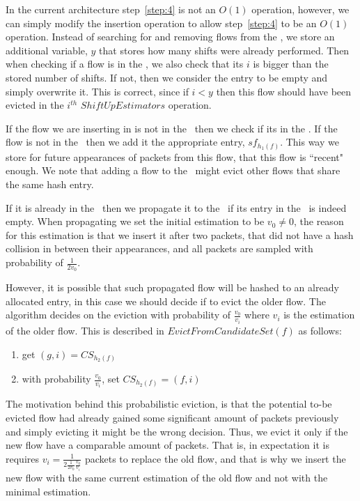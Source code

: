 In the current architecture step~\ref{step:4} is not an $O(1)$ operation, however, we can simply modify the insertion operation to allow step~\ref{step:4} to be an $O(1)$ operation. Instead of searching for and removing flows from the \cs, we store an additional variable, $y$ that stores how many shifts were already performed. Then when checking if a flow is in the \cs, we also check that its $i$ is bigger than the stored number of shifts. If not, then we consider the entry to be empty and simply overwrite it. This is correct, since if $i<y$ then this flow should have been evicted in the $i^{th}$ $ShiftUpEstimators$ operation.

If the flow we are inserting in is not in the \cs\ then we check if its in the \sfa. If the flow is not in the \sfa\ then we add it the appropriate entry, $sf_{h_1(f)}$. This way we store for future appearances of packets from this flow, that this flow is ``recent" enough. We note that adding a flow to the \sfa\ might evict other flows that share the same hash entry.

If it is already in the \sfa\ then we propagate it to the \cs\ if its entry in the \cs\ is indeed empty. When propagating we set the initial estimation to be $v_0 \neq 0$, the reason for this estimation is that we insert it after two packets, that did not have a hash collision in between their appearances, and all packets are sampled with probability of $\frac{1}{2v_0}$.

However, it is possible that such propagated flow will be hashed to an already allocated entry, in this case we should decide if to evict the older flow. The algorithm decides on the eviction with probability of $\frac{v_0}{v_i}$ where $v_i$ is the estimation of the older flow. This is described in $EvictFromCandidateSet(f)$ as follows:
\begin{enumerate}
    \item get $(g,i)=CS_{h_2(f)}$
    \item with probability $\frac{v_0}{v_i}$, set $CS_{h_2(f)}=(f,i)$
\end{enumerate}

The motivation behind this probabilistic eviction, is that the potential to-be evicted flow had already gained some significant amount of packets previously and simply evicting it might be the wrong decision. Thus, we evict it only if the new flow have a comparable amount of packets. That is, in expectation it is requires $v_i = \frac{1}{ 2\frac{1}{2v_0}\frac{v_0}{v_i}}$ packets to replace the old flow, and that is why we insert the new flow with the same current estimation of the old flow and not with the minimal estimation.


